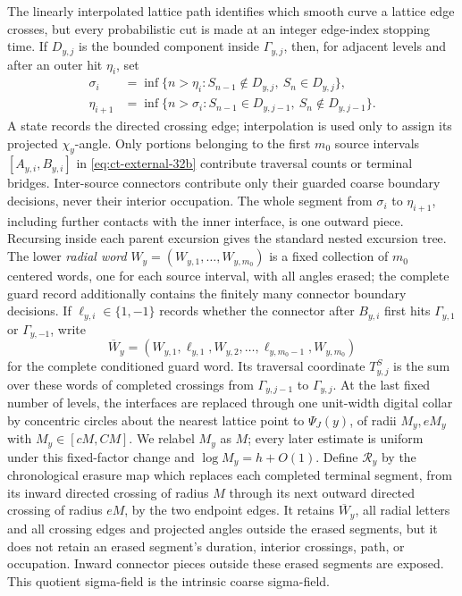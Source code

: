 \documentclass[12pt,reqno]{amsart}
\theoremstyle{plain}
\theoremstyle{definition}
\theoremstyle{remark}
\numberwithin{equation}{section}
\begin{document}
The linearly interpolated lattice path identifies which smooth curve a
lattice edge crosses, but every probabilistic cut is made at an integer
edge-index stopping time.  If $D_{y,j}$ is the bounded component inside
$\Gamma_{y,j}$, then, for adjacent levels and after an outer hit
$\eta_i$, set
\begin{equation}
\begin{aligned}
\sigma_i&=\inf\{n>\eta_i:S_{n-1}\notin D_{y,j},\ S_n\in D_{y,j}\},\\
\eta_{i+1}&=\inf\{n>\sigma_i:S_{n-1}\in D_{y,j-1},\
                                  S_n\notin D_{y,j-1}\}.
\end{aligned}\label{eq:ct-transfer-39h}
\end{equation}
A state records the directed crossing edge; interpolation is used only to
assign its projected $\chi_y$-angle.
Only portions belonging to the first $m_0$ source intervals
$[A_{y,i},B_{y,i}]$ in \eqref{eq:ct-external-32b} contribute traversal counts or terminal
bridges.  Inter-source connectors contribute only their guarded coarse
boundary decisions, never their interior occupation.  The whole segment
from $\sigma_i$ to $\eta_{i+1}$, including further contacts with the
inner interface, is one outward piece.  Recursing inside each parent
excursion gives the standard nested excursion tree.  The lower
\emph{radial word} $W_y=(W_{y,1},\ldots,W_{y,m_0})$ is a fixed collection
of $m_0$ centered words, one for each source interval, with all angles
erased; the complete guard record additionally contains the finitely many
connector boundary decisions.  If
$\ell_{y,i}\in\{1,-1\}$ records whether the connector after
$B_{y,i}$ first hits $\Gamma_{y,1}$ or $\Gamma_{y,-1}$, write
\begin{equation}
\overline W_y=(W_{y,1},\ell_{y,1},W_{y,2},\ldots,
                 \ell_{y,m_0-1},W_{y,m_0})\label{eq:ct-transfer-39hprime}
\end{equation}
for the complete conditioned guard word.  Its traversal coordinate
$T^S_{y,j}$ is the sum over these
words of completed crossings from $\Gamma_{y,j-1}$ to
$\Gamma_{y,j}$.  At the last
fixed number of levels, the interfaces are replaced through one
unit-width digital collar by concentric circles about the nearest lattice
point to $\Psi_J(y)$, of radii $M_y,eM_y$ with
$M_y\in[cM,CM]$.  We relabel $M_y$ as $M$; every later estimate is
uniform under this fixed-factor change and $\log M_y=h+O(1)$.
Define $\mathcal{R}_y$ by the chronological erasure map which replaces each
completed terminal segment, from its inward directed crossing of radius
$M$ through its next outward directed crossing of radius $eM$, by the
two endpoint edges.  It retains $\overline W_y$, all radial letters and
all crossing edges and projected angles outside the erased segments, but
it does not retain an erased segment's duration, interior crossings, path,
or occupation.  Inward connector pieces outside these erased segments are
exposed.  This quotient sigma-field is the intrinsic coarse sigma-field.
\end{document}
